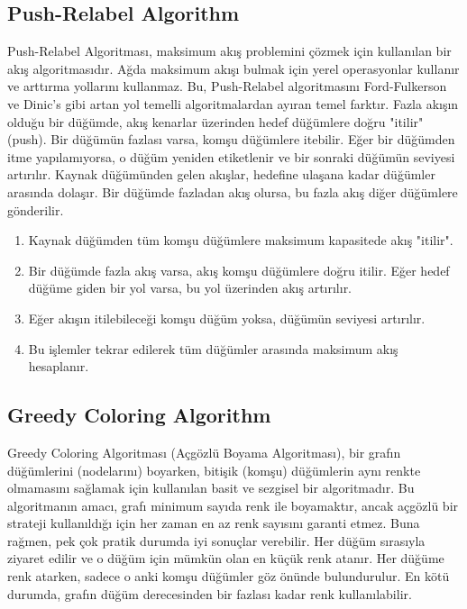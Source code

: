 \newpage

\subsection{Push-Relabel Algorithm}

Push-Relabel Algoritması, maksimum akış problemini çözmek için kullanılan bir akış algoritmasıdır. Ağda maksimum akışı bulmak için yerel operasyonlar kullanır ve arttırma yollarını kullanmaz. Bu, Push-Relabel algoritmasını Ford-Fulkerson ve Dinic's gibi artan yol temelli algoritmalardan ayıran temel farktır. Fazla akışın olduğu bir düğümde, akış kenarlar üzerinden hedef düğümlere doğru "itilir" (push). Bir düğümün fazlası varsa, komşu düğümlere itebilir. Eğer bir düğümden itme yapılamıyorsa, o düğüm yeniden etiketlenir ve bir sonraki düğümün seviyesi artırılır. Kaynak düğümünden gelen akışlar, hedefine ulaşana kadar düğümler arasında dolaşır. Bir düğümde fazladan akış olursa, bu fazla akış diğer düğümlere gönderilir.

\begin{enumerate}
    \item Kaynak düğümden tüm komşu düğümlere maksimum kapasitede akış "itilir".
    \item Bir düğümde fazla akış varsa, akış komşu düğümlere doğru itilir. Eğer hedef düğüme giden bir yol varsa, bu yol üzerinden akış artırılır.
    \item Eğer akışın itilebileceği komşu düğüm yoksa, düğümün seviyesi artırılır.
    \item Bu işlemler tekrar edilerek tüm düğümler arasında maksimum akış hesaplanır.
\end{enumerate}

\newpage

\subsection{Greedy Coloring Algorithm}

Greedy Coloring Algoritması (Açgözlü Boyama Algoritması), bir grafın düğümlerini (nodelarını) boyarken, bitişik (komşu) düğümlerin aynı renkte olmamasını sağlamak için kullanılan basit ve sezgisel bir algoritmadır. Bu algoritmanın amacı, grafı minimum sayıda renk ile boyamaktır, ancak açgözlü bir strateji kullanıldığı için her zaman en az renk sayısını garanti etmez. Buna rağmen, pek çok pratik durumda iyi sonuçlar verebilir. Her düğüm sırasıyla ziyaret edilir ve o düğüm için mümkün olan en küçük renk atanır. Her düğüme renk atarken, sadece o anki komşu düğümler göz önünde bulundurulur. En kötü durumda, grafın düğüm derecesinden bir fazlası kadar renk kullanılabilir.


